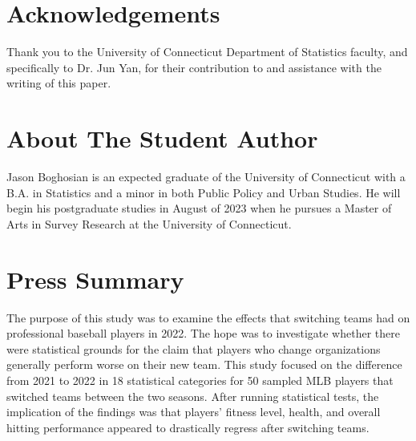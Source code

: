 \documentclass[10pt]{article}
\begin{document}



\section{Acknowledgements}

Thank you to the University of Connecticut Department of Statistics faculty, and specifically to Dr. Jun Yan, for their 
contribution to and assistance with the writing of this paper.

\section{About The Student Author}

Jason Boghosian is an expected graduate of the University of Connecticut with a B.A. in Statistics and a minor in both 
Public Policy and Urban Studies. He will begin his postgraduate studies in August of 2023 when he pursues a Master of Arts 
in Survey Research at the University of Connecticut.

\section{Press Summary}

The purpose of this study was to examine the effects that switching teams had on professional baseball players in 2022. The 
hope was to investigate whether there were statistical grounds for the claim that players who change organizations generally 
perform worse on their new team. This study focused on the difference from 2021 to 2022 in 18 statistical categories for 50 
sampled MLB players that switched teams between the two seasons. After running statistical tests, the implication of the 
findings was that players’ fitness level, health, and overall hitting performance appeared to drastically regress after 
switching teams.
\end{document}
